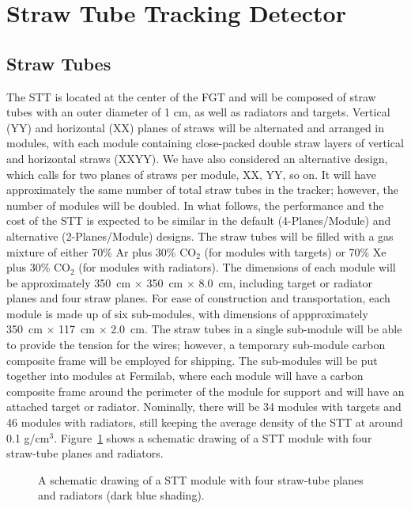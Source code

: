 \section{Straw Tube Tracking Detector}

\subsection{Straw Tubes}

The STT is located at the center of the FGT and 
will be composed of straw tubes with an outer diameter of 1 cm, as well as 
radiators and targets. 
Vertical (YY) and horizontal (XX) planes of straws will be alternated and 
arranged in modules, with each module containing close-packed double straw layers 
of vertical and horizontal straws (XXYY). 
We have also considered an alternative design, which calls for two planes of straws
per module, XX, YY, so on. It will have approximately the same number of
total straw tubes in the tracker; however, the number of modules will be doubled.
In what follows, the performance and the cost of the STT is expected to be similar 
in the default (4-Planes/Module) and alternative (2-Planes/Module) designs.
The straw tubes will be filled with a
gas mixture of either 70\% Ar plus 30\% CO$_2$ (for modules with targets) or
70\% Xe plus 30\% CO$_2$ (for modules with radiators).
The dimensions of each module will
be approximately 350~cm $\times$ 350~cm $\times$ 8.0~cm, including 
target or radiator planes and four straw planes. For ease of construction and
transportation, each module is made up of six sub-modules, with dimensions of
appproximately 350~cm $\times$ 117~cm $\times$ 2.0~cm. 
The straw tubes in a single sub-module will be able to provide the tension 
for the wires; however, a temporary sub-module carbon composite frame will 
be employed for shipping. The sub-modules will be put together into modules 
at Fermilab, where each module will have a carbon composite frame around 
the perimeter of the module for support and will have an attached target or 
radiator. Nominally, there will be 34 modules with targets and 46 modules 
with radiators, still keeping the 
average density of the STT at around 0.1 g/cm$^3$. Figure~\ref{STT_Detail}
shows a schematic drawing of a STT module with four straw-tube planes and
radiators.

\begin{figure}
\begin{center}
\label{STT_Detail}
\caption{A schematic drawing of a STT module with four straw-tube planes and
radiators (dark blue shading).}
\end{center}
\end{figure}


